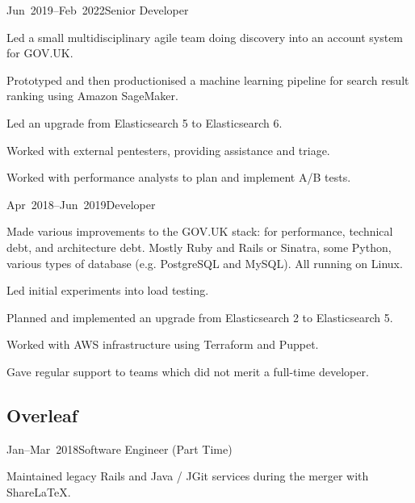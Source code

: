 \documentclass[a4paper]{barrucadu-cv}
\newcommand{\range}[2]{#1–#2}
\begin{document}
\begin{cventry}{\range{Jun~2019}{Feb~2022}}{Senior Developer}
  \begin{tightitemize}
  \item Led a small multidisciplinary agile team doing discovery into an account system for GOV.UK.
  \item Prototyped and then productionised a machine learning pipeline for search result ranking using Amazon SageMaker.
  \item Led an upgrade from Elasticsearch 5 to Elasticsearch 6.
  \item Worked with external pentesters, providing assistance and triage.
  \item Worked with performance analysts to plan and implement A/B tests.
  \end{tightitemize}
\end{cventry}

\begin{cventry}{\range{Apr~2018}{Jun~2019}}{Developer}
  \begin{tightitemize}
  \item Made various improvements to the GOV.UK stack: for performance, technical debt, and architecture debt.  Mostly Ruby and Rails or Sinatra, some Python, various types of database (e.g. PostgreSQL and MySQL).  All running on Linux.
  \item Led initial experiments into load testing.
  \item Planned and implemented an upgrade from Elasticsearch 2 to Elasticsearch 5.
  \item Worked with AWS infrastructure using Terraform and Puppet.
  \item Gave regular support to teams which did not merit a full-time developer.
  \end{tightitemize}
\end{cventry}

\subsection{Overleaf}

\begin{cventry}{\range{Jan}{Mar}~2018}{Software Engineer (Part Time)}
  \begin{tightitemize}
  \item Maintained legacy Rails and Java / JGit services during the merger with ShareLaTeX.
  \end{tightitemize}
\end{cventry}
\end{document}

